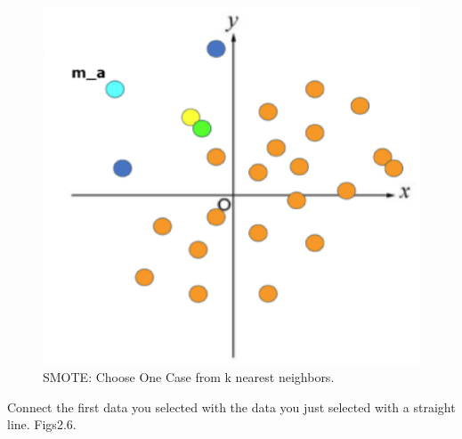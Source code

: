 \begin{center}
    \begin{figure}[ht]
        \caption{SMOTE: Choose One Case from k nearest neighbors.}
        \label{tab:team-rating-features}
        \begin{center}
            \includegraphics[scale=0.6]{image/smote4.eps}
        \end{center}
    \end{figure}
\end{center}

\clearpage
Connect the first data you selected with the data you just selected with a straight line. Figs2.6.

